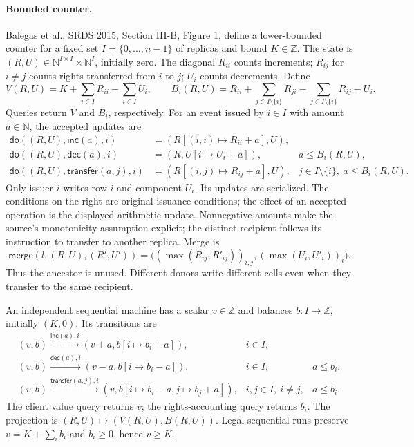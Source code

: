 \documentclass[11pt]{article}
\theoremstyle{definition}
\newcommand{\doop}{\mathsf{do}}
\begin{document}
\paragraph{Bounded counter.}

Balegas et al., SRDS 2015, Section III-B, Figure 1, define a lower-bounded
counter for a fixed set $I=\{0,\ldots,n-1\}$ of replicas and bound $K\in\mathbb Z$.
The state is $(R,U)\in\mathbb N^{I\times I}\times\mathbb N^I$, initially zero.
The diagonal $R_{ii}$ counts increments; $R_{ij}$ for $i\ne j$ counts rights
transferred from $i$ to $j$; $U_i$ counts decrements. Define
\[
 V(R,U)=K+\sum_{i\in I}R_{ii}-\sum_{i\in I}U_i,\qquad
 B_i(R,U)=R_{ii}+\sum_{j\in I\setminus\{i\}}R_{ji}
                 -\sum_{j\in I\setminus\{i\}}R_{ij}-U_i.
\]
Queries return $V$ and $B_i$, respectively. For an event issued by $i\in I$
with amount $a\in\mathbb N$, the accepted updates are
\[
\begin{array}{lll}
 \doop((R,U),\mathsf{inc}(a),i)&=(R[(i,i)\mapsto R_{ii}+a],U),&\\
 \doop((R,U),\mathsf{dec}(a),i)&=(R,U[i\mapsto U_i+a]),&a\le B_i(R,U),\\
 \doop((R,U),\mathsf{transfer}(a,j),i)&=(R[(i,j)\mapsto R_{ij}+a],U),&
 j\in I\setminus\{i\},\ a\le B_i(R,U).
\end{array}
\]
Only issuer $i$ writes row $i$ and component $U_i$. Its updates are serialized.
The conditions on the right are original-issuance conditions; the effect of an
accepted operation is the displayed arithmetic update. Nonnegative amounts
make the source's monotonicity assumption explicit; the distinct recipient
follows its instruction to transfer to another replica. Merge is
\[
 \mathsf{merge}(l,(R,U),(R',U'))=
 \bigl((\max(R_{ij},R'_{ij}))_{i,j},(\max(U_i,U'_i))_i\bigr).
\]
Thus the ancestor is unused. Different donors write different cells even when
they transfer to the same recipient.

An independent sequential machine has a scalar $v\in\mathbb Z$ and balances
$b:I\to\mathbb Z$, initially $(K,0)$. Its transitions are
\[
\begin{array}{lll}
 (v,b)\xrightarrow{\mathsf{inc}(a),i}(v+a,b[i\mapsto b_i+a]),&i\in I,&\\
 (v,b)\xrightarrow{\mathsf{dec}(a),i}(v-a,b[i\mapsto b_i-a]),&i\in I,&a\le b_i,\\
 (v,b)\xrightarrow{\mathsf{transfer}(a,j),i}
 (v,b[i\mapsto b_i-a,j\mapsto b_j+a]),&i,j\in I,\ i\ne j,&a\le b_i.
\end{array}
\]
The client value query returns $v$; the rights-accounting query returns $b_i$.
The projection is $(R,U)\mapsto(V(R,U),B(R,U))$.
Legal sequential runs preserve $v=K+\sum_i b_i$ and $b_i\ge0$, hence $v\ge K$.
\end{document}
